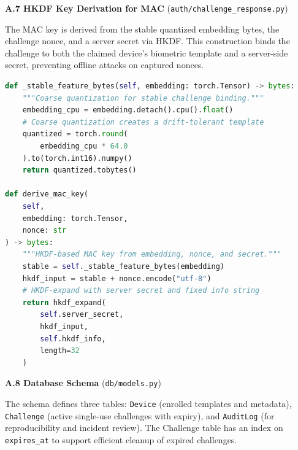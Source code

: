 \vspace{0.5cm}
\noindent\textbf{A.7 \quad HKDF Key Derivation for MAC} (\texttt{auth/challenge\_response.py})

\vspace{0.3cm}
The MAC key is derived from the stable quantized embedding bytes, the challenge nonce, and a server secret via HKDF. This construction binds the challenge to both the claimed device's biometric template and a server-side secret, preventing offline attacks on captured nonces.

\begin{lstlisting}[language=Python, basicstyle=\ttfamily\small]
def _stable_feature_bytes(self, embedding: torch.Tensor) -> bytes:
    """Coarse quantization for stable challenge binding."""
    embedding_cpu = embedding.detach().cpu().float()
    # Coarse quantization creates a drift-tolerant template
    quantized = torch.round(
        embedding_cpu * 64.0
    ).to(torch.int16).numpy()
    return quantized.tobytes()

def derive_mac_key(
    self,
    embedding: torch.Tensor,
    nonce: str
) -> bytes:
    """HKDF-based MAC key from embedding, nonce, and secret."""
    stable = self._stable_feature_bytes(embedding)
    hkdf_input = stable + nonce.encode("utf-8")
    # HKDF-expand with server secret and fixed info string
    return hkdf_expand(
        self.server_secret,
        hkdf_input,
        self.hkdf_info,
        length=32
    )
\end{lstlisting}

\vspace{0.5cm}
\noindent\textbf{A.8 \quad Database Schema} (\texttt{db/models.py})

\vspace{0.3cm}
The schema defines three tables: \texttt{Device} (enrolled templates and metadata), \texttt{Challenge} (active single-use challenges with expiry), and \texttt{AuditLog} (for reproducibility and incident review). The Challenge table has an index on \texttt{expires\_at} to support efficient cleanup of expired challenges.

